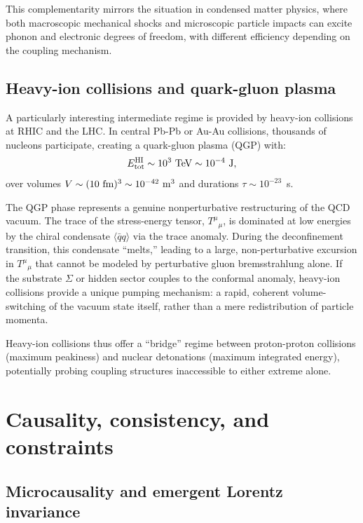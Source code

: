 \documentclass[aps,prd,twocolumn,nofootinbib,superscriptaddress]{revtex4-2}
\begin{document}
This complementarity mirrors the situation in condensed matter physics, where both macroscopic mechanical shocks and microscopic particle impacts can excite phonon and electronic degrees of freedom, with different efficiency depending on the coupling mechanism.

\subsection{Heavy-ion collisions and quark-gluon plasma}

A particularly interesting intermediate regime is provided by heavy-ion collisions at RHIC and the LHC. In central Pb-Pb or Au-Au collisions, thousands of nucleons participate, creating a quark-gluon plasma (QGP) with:
\begin{equation}
    E_{\rm tot}^{\rm HI} \sim 10^{3}~{\rm TeV} \sim 10^{-4}~{\rm J},
\end{equation}
over volumes $V \sim (10~{\rm fm})^3 \sim 10^{-42}~{\rm m}^3$ and durations $\tau \sim 10^{-23}$~s.

The QGP phase represents a genuine nonperturbative restructuring of the QCD vacuum. The trace of the stress-energy tensor, $T^\mu{}_\mu$, is dominated at low energies by the chiral condensate $\langle \bar{q} q \rangle$ via the trace anomaly. During the deconfinement transition, this condensate ``melts,'' leading to a large, non-perturbative excursion in $T^\mu{}_\mu$ that cannot be modeled by perturbative gluon bremsstrahlung alone. If the substrate $\Sigma$ or hidden sector couples to the conformal anomaly, heavy-ion collisions provide a unique pumping mechanism: a rapid, coherent volume-switching of the vacuum state itself, rather than a mere redistribution of particle momenta.

Heavy-ion collisions thus offer a ``bridge'' regime between proton-proton collisions (maximum peakiness) and nuclear detonations (maximum integrated energy), potentially probing coupling structures inaccessible to either extreme alone.

\section{Causality, consistency, and constraints}
\label{sec:constraints}

\subsection{Microcausality and emergent Lorentz invariance}
\end{document}
